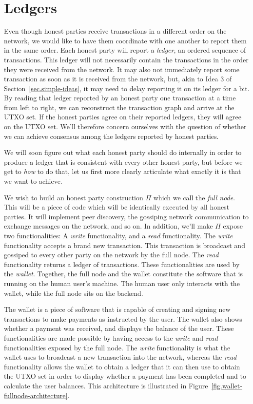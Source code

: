 \section{Ledgers}

Even though honest parties receive transactions in a different order on the network,
we would like to have them coordinate with one another to report them in the same
order. Each honest party will report a \emph{ledger}, an ordered sequence of transactions.
This ledger will not necessarily contain the transactions in the order they were
received from the network. It may also not immediately report some transaction as
soon as it is received from the network, but, akin to Idea 3 of Section~\ref{sec.simple-ideas},
it may need to delay reporting it on its ledger for a bit.
By reading that ledger reported by an honest party one transaction at a time from left to right,
we can reconstruct the transaction graph and arrive at the UTXO set. If the honest parties
agree on their reported ledgers, they will agree on the UTXO set. We'll therefore concern
ourselves with the question of whether we can achieve consensus among the ledgers reported
by honest parties.

We will soon figure out what each honest party should do internally in order to produce
a ledger that is consistent with every other honest party, but before we get to \emph{how}
to do that, let us first more clearly articulate what exactly it is that we want to achieve.

We wish to build an honest party construction $\Pi$ which we call the \emph{full node}.
This will be a piece of code which will be identically executed by all honest parties.
It will implement peer discovery, the
gossiping network communication to exchange messages on the network, and so on. In
addition, we'll make $\Pi$ expose two functionalities: A
\emph{write} functionality, and a \emph{read} functionality. The \emph{write} functionality
accepts a brand new transaction. This transaction is
broadcast and gossiped to every other party on the network by the full node.
The \emph{read} functionality returns a ledger of transactions.
These functionalities are used by the \emph{wallet}. Together, the full node and
the wallet constitute the software that is running on the human user's machine.
The human user only interacts with the wallet, while the full node sits on the backend.

The wallet is a piece of software that is capable of creating and signing
new transactions to make payments as instructed by the user. The wallet also shows
whether a payment was received, and displays the balance of the user. These functionalities
are made possible by having access to the \emph{write} and \emph{read} functionalities
exposed by the full node. The \emph{write} functionality is what the wallet uses to
broadcast a new transaction into the network, whereas the \emph{read} functionality
allows the wallet to obtain a ledger that it can then use to obtain the UTXO set
in order to display whether a payment has been completed and to calculate the user
balances. This architecture is illustrated in Figure~\ref{fig.wallet-fullnode-architecture}.

